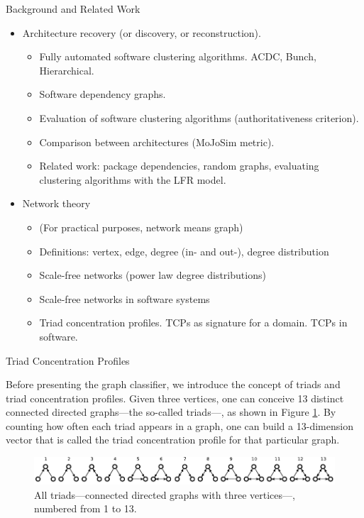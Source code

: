 \documentclass[11pt,twocolumn,a4paper,english]{article}
\begin{document}

\begin{section}{Background and Related Work}
	\begin{itemize}
		\item Architecture recovery (or discovery, or reconstruction). 
		\begin{itemize}
			\item Fully automated software clustering algorithms. ACDC, Bunch, Hierarchical.
			\item Software dependency graphs.
			\item Evaluation of software clustering algorithms (authoritativeness criterion).
			\item Comparison between architectures (MoJoSim metric).
			\item Related work: package dependencies, random graphs, evaluating clustering algorithms with the LFR model.
		\end{itemize}
		
		\item Network theory
		\begin{itemize}
			\item (For practical purposes, network means graph)
			\item Definitions: vertex, edge, degree (in- and out-), degree distribution
			\item Scale-free networks (power law degree distributions)
			\item Scale-free networks in software systems
			\item Triad concentration profiles. TCPs as signature for a domain. TCPs in software. 
		\end{itemize}
	\end{itemize}

	\begin{subsection}{Triad Concentration Profiles}

		Before presenting the graph classifier, we introduce the concept of triads and triad concentration profiles. Given three vertices, one can conceive 13 distinct connected directed graphs---the so-called triads---, as shown in Figure \ref{fig:triads}. By counting how often each triad appears in a graph, one can build a 13-dimension vector that is called the triad concentration profile for that particular graph. %

		\begin{figure}[htbp]
			\centering
				\includegraphics[scale=1]{figures/triads}
			\caption{All triads---connected directed graphs with three vertices---, numbered from 1 to 13.}
			\label{fig:triads}
		\end{figure}


\end{subsection}
\end{section}
\end{document}
